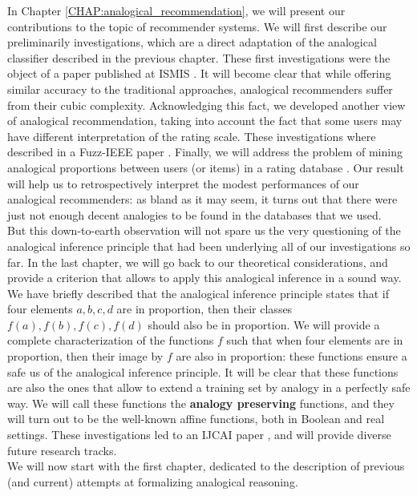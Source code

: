 In Chapter \ref{CHAP:analogical_recommendation}, we will present our
contributions to the topic of recommender systems. We will first describe our
preliminarily investigations, which are a direct adaptation of the analogical
classifier described in the previous chapter. These first investigations were
the object of a paper published at ISMIS \cite{HugPraRicISMIS15}. It will
become clear that while offering similar accuracy to the traditional
approaches, analogical recommenders suffer from their cubic complexity.
Acknowledging this fact, we developed another view of analogical
recommendation, taking into account the fact that some users may have different
interpretation of the rating scale. These investigations where described in a
Fuzz-IEEE paper \cite{HugPraRicSerFuzzIEEE16}. Finally, we will address the
problem of mining analogical proportions between users (or items) in a rating
database \cite{HugPraRicSerLFA16}. Our result will help us to retrospectively
interpret the modest performances of our analogical recommenders: as bland as
it may seem, it turns out that there were just not enough decent analogies to
be found in the databases that we used.\\

But this down-to-earth observation will not spare us the very questioning of
the analogical inference principle that had been underlying all of our
investigations so far. In the last chapter, we will go back to our theoretical
considerations, and provide a criterion that allows to apply this analogical
inference in a sound way. We have briefly described that the analogical
inference principle states that if four elements $a, b, c, d$ are in
proportion, then their classes $f(a), f(b), f(c), f(d)$ should also be in
proportion. We will provide a complete characterization of the functions $f$
such that when four elements are in proportion, then their image by $f$ are
also in proportion: these functions ensure a safe us of the analogical
inference principle. It will be clear that these functions are also the ones
that allow to extend a training set by analogy in a perfectly safe way. We will
call these functions the \textbf{analogy preserving} functions, and they will
turn out to be the well-known affine functions, both in Boolean and real
settings. These investigations led to an IJCAI paper
\cite{CouHugPraRicIJCAI17}, and will provide diverse future research tracks.\\


We will now start with the first chapter, dedicated to the description of
previous (and current) attempts at formalizing analogical reasoning.
